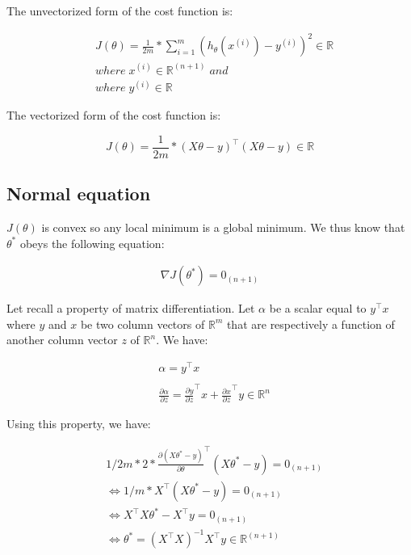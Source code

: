 \documentclass[a4paper, 12pt]{article}
\begin{document}
\noindent
The unvectorized form of the cost function is:

\begin{align*}
& J(\theta) = \frac{1}{2m} * \sum_{i=1}^{m} (h_{\theta}(x^{(i)}) - y^{(i)})^{2} \in \mathbb{R} \\
& where \; x^{(i)} \in \mathbb{R}^{(n+1)} \; and \\
& where \; y^{(i)} \in \mathbb{R}
\end{align*}

\noindent
The vectorized form of the cost function is:

\begin{equation}
J(\theta) = \frac{1}{2m} * (X\theta - y)^{\top}(X\theta - y) \in \mathbb{R}
\end{equation}

\subsection{Normal equation}

$J(\theta)$ is convex so any local minimum is  a global minimum. We thus know that $\theta^{*}$ obeys the following equation:

\begin{align*}
\nabla J(\theta^{*}) = 0_{(n+1)}
\end{align*}

Let recall a property of matrix differentiation. Let $\alpha$ be a scalar equal to $y^{\top}x$ where $y$ and $x$ be two column vectors of $\mathbb{R}^m$ that are respectively a function of another column vector $z$ of $\mathbb{R}^n$. We have:

\begin{align*}
& \alpha = y^{\top}x \\
& \\
& \frac{\partial \alpha}{\partial z}= {\frac{\partial y}{\partial z}}^{\top}x + {\frac{\partial x}{\partial z}}^{\top}y \in \mathbb{R}^n
\end{align*}

Using this property, we have:

\begin{align*}
& 1/2m*2*{\frac{\partial (X\theta^* - y)}{\partial \theta}}^{\top}(X\theta^* - y) = 0_{(n+1)} \\
& \iff 1/m*X^{\top}(X\theta^* - y) = 0_{(n+1)} \\
& \iff X^{\top}X\theta^* - X^{\top}y = 0_{(n+1)} \\
& \boxed{\iff \theta^* = {(X^{\top}X)}^{-1}X^{\top}y \in \mathbb{R}^{(n+1)}}
\end{align*}
\end{document}
